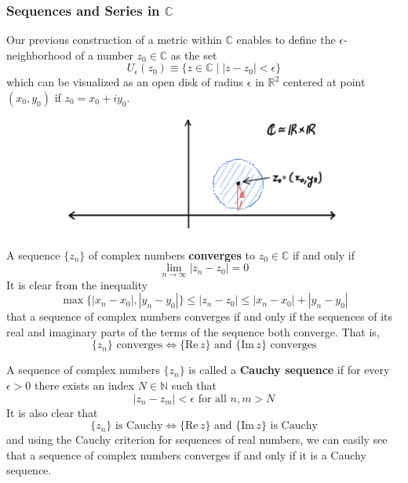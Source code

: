     \subsubsection[Sequences and Series in C]{Sequences and Series in $\mathbb{C}$}
    Our previous construction of a metric within $\mathbb{C}$ enables to define the $\epsilon$-neighborhood of a number $z_0 \in \mathbb{C}$ as the set
    \[U_\epsilon (z_0) \equiv \{z \in \mathbb{C}\;|\; |z - z_0| < \epsilon\}\]
    which can be visualized as an open disk of radius $\epsilon$ in $\mathbb{R}^2$ centered at point $(x_0, y_0)$ if $z_0 = x_0 + i y_0$. 
    \begin{center}
        \includegraphics[scale=0.25]{img/Epsilon_Neighborhood_in_C.jpg}
    \end{center}

    \begin{definition}
      A sequence $\{z_n\}$ of complex numbers \textbf{converges} to $z_0 \in \mathbb{C}$ if and only if 
      \[\lim_{n \rightarrow \infty} |z_n - z_0| = 0\]
      It is clear from the inequality
      \[\max\{|x_n - x_0|, |y_n - y_0|\} \leq |z_n - z_0| \leq |x_n - x_0| + |y_n - y_0|\]
      that a sequence of complex numbers converges if and only if the sequences of its real and imaginary parts of the terms of the sequence both converge. That is, 
      \[\{z_n\} \text{ converges} \iff \{\text{Re}\,z\} \text{ and } \{\text{Im}\,z\} \text{ converges}\]
    \end{definition}

    \begin{lemma}
      A sequence of complex numbers $\{z_n\}$ is called a \textbf{Cauchy sequence} if for every $\epsilon>0$ there exists an index $N \in \mathbb{N}$ such that
      \[|z_n - z_m|<\epsilon \text{ for all } n, m > N\]
      It is also clear that 
      \[\{z_n\} \text{ is Cauchy} \iff \{\text{Re}\,z\} \text{ and } \{\text{Im}\,z\} \text{ is Cauchy}\]
      and using the Cauchy criterion for sequences of real numbers, we can easily see that a sequence of complex numbers converges if and only if it is a Cauchy sequence. 
    \end{lemma}


